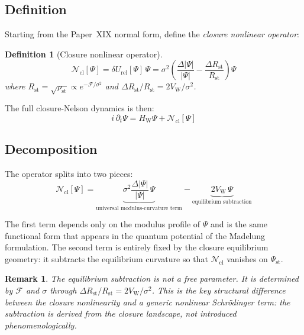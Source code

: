 \documentclass[12pt]{article}
\newtheorem{definition}[theorem]{Definition}
\newtheorem{remark}[theorem]{Remark}
\newcommand{\Fcal}{\mathcal{F}}
\newcommand{\Ncl}{\mathcal{N}_{\mathrm{cl}}}
\newcommand{\VW}{V_{\mathrm{W}}}
\newcommand{\HW}{H_{\mathrm{W}}}
\newcommand{\Rst}{R_{\mathrm{st}}}
\newcommand{\dUrel}{\delta U_{\mathrm{rel}}}
\begin{document}
\subsection{Definition}

Starting from the Paper~XIX normal form, define the \textit{closure nonlinear operator}:

\begin{definition}[Closure nonlinear operator]\label{def:Ncl}
\begin{equation}\label{eq:Ncl}
    \Ncl[\Psi] = \dUrel[\Psi]\,\Psi = \sigma^2\left(\frac{\Delta|\Psi|}{|\Psi|} - \frac{\Delta\Rst}{\Rst}\right)\Psi
\end{equation}
where $\Rst = \sqrt{\rho_{\mathrm{st}}} \propto e^{-\Fcal/\sigma^2}$ and $\Delta\Rst/\Rst = 2\VW/\sigma^2$.
\end{definition}

The full closure-Nelson dynamics is then:
\begin{equation}\label{eq:full}
    i\,\partial_t\Psi = \HW\Psi + \Ncl[\Psi]
\end{equation}

\subsection{Decomposition}

The operator splits into two pieces:
\begin{equation}\label{eq:decomposition}
    \Ncl[\Psi] = \underbrace{\sigma^2\frac{\Delta|\Psi|}{|\Psi|}\,\Psi}_{\text{universal modulus-curvature term}} - \underbrace{2\VW\,\Psi}_{\text{equilibrium subtraction}}
\end{equation}

The first term depends only on the modulus profile of $\Psi$ and is the same functional form that appears in the quantum potential of the Madelung formulation. The second term is entirely fixed by the closure equilibrium geometry: it subtracts the equilibrium curvature so that $\Ncl$ vanishes on $\Psi_{\mathrm{st}}$.

\begin{remark}
The equilibrium subtraction is not a free parameter. It is determined by $\Fcal$ and $\sigma$ through $\Delta\Rst/\Rst = 2\VW/\sigma^2$. This is the key structural difference between the closure nonlinearity and a generic nonlinear Schr\"odinger term: the subtraction is \textit{derived from the closure landscape}, not introduced phenomenologically.
\end{remark}
\end{document}

